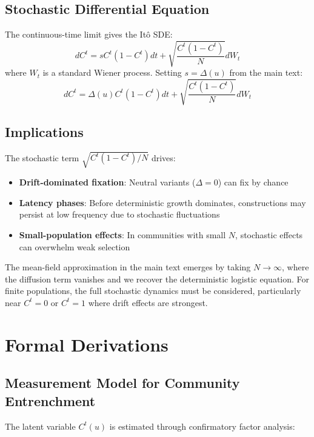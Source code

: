 \documentclass[12pt]{article}
\begin{document}
\subsection{Stochastic Differential Equation}

The continuous-time limit gives the Itô SDE:
$$dC^t = sC^t(1-C^t)dt + \sqrt{\frac{C^t(1-C^t)}{N}}dW_t$$
where $W_t$ is a standard Wiener process. Setting $s = \Delta(u)$ from the main text:
$$dC^t = \Delta(u)C^t(1-C^t)dt + \sqrt{\frac{C^t(1-C^t)}{N}}dW_t$$

\subsection{Implications}

The stochastic term $\sqrt{C^t(1-C^t)/N}$ drives:
\begin{itemize}
\item \textbf{Drift-dominated fixation}: Neutral variants ($\Delta = 0$) can fix by chance
\item \textbf{Latency phases}: Before deterministic growth dominates, constructions may persist at low frequency due to stochastic fluctuations
\item \textbf{Small-population effects}: In communities with small $N$, stochastic effects can overwhelm weak selection
\end{itemize}

The mean-field approximation in the main text emerges by taking $N \to \infty$, where the diffusion term vanishes and we recover the deterministic logistic equation. For finite populations, the full stochastic dynamics must be considered, particularly near $C^t = 0$ or $C^t = 1$ where drift effects are strongest.

\section{Formal Derivations}

\subsection{Measurement Model for Community Entrenchment}

The latent variable $C^t(u)$ is estimated through confirmatory factor analysis:
\end{document}
